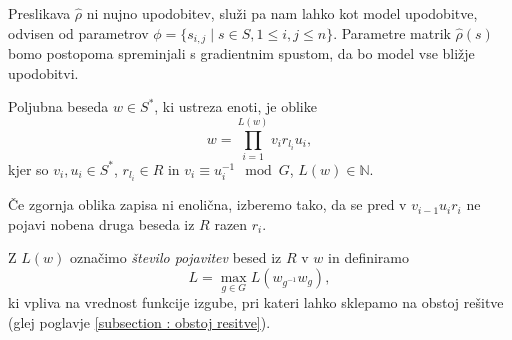 \documentclass[mat2, tisk]{fmfdelo}
\newcommand{\N}{\mathbb N}
\begin{document}
%
%
%
%
Preslikava $\hat \rho$ ni nujno upodobitev, služi pa nam lahko
kot model upodobitve, odvisen od parametrov $\phi = \{s_{i,j}
\mid s \in S, 1 \leq i, j \leq n\}$.
Parametre matrik $\hat\rho(s)$ bomo postopoma spreminjali s
gradientnim spustom, da bo model vse bližje upodobitvi.
\begin{definicija}
  Poljubna beseda $w \in S^*$, ki ustreza enoti, je oblike
  $$w  = \prod_{i=1}^{L(w)} {v_i r_{l_i}} u_i,$$
  kjer so $v_i, u_i \in S^*$, $r_{l_i} \in R$ in
  $v_i \equiv u_i^{-1}  \mod G$, $L(w) \in \N$.

  Če zgornja oblika zapisa ni enolična, izberemo tako, da se
  pred v $v_{i-1} u_i r_i$ ne pojavi nobena druga beseda iz $R$ razen $r_i$.

  Z $L(w)$ označimo \emph{število pojavitev}
  besed iz $R$ v
  $w$ in definiramo
  $$L=\max_{g \in G} L(w_{g^{-1}} w_g),$$
  ki vpliva na
  vrednost funkcije izgube, pri kateri lahko sklepamo na obstoj
  rešitve (glej poglavje \ref{subsection : obstoj resitve}).
\end{definicija}
%
\end{document}
